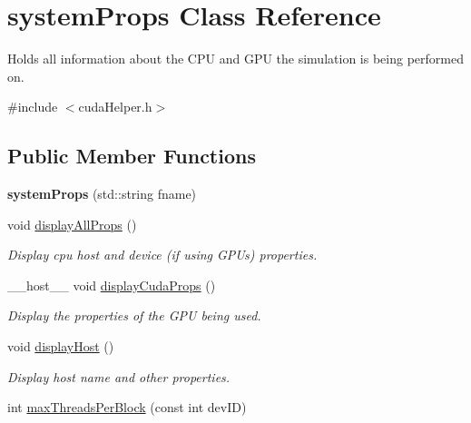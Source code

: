 \hypertarget{classsystem_props}{\section{system\-Props Class Reference}
\label{classsystem_props}
}


Holds all information about the C\-P\-U and G\-P\-U the simulation is being performed on.  




{\ttfamily \#include $<$cuda\-Helper.\-h$>$}

\subsection*{Public Member Functions}
\begin{DoxyCompactItemize}
\item 
\hypertarget{classsystem_props_a95e6d858d3ee3a0c9670156cf07c9e74}{{\bfseries system\-Props} (std\-::string fname)}\label{classsystem_props_a95e6d858d3ee3a0c9670156cf07c9e74}

\item 
\hypertarget{classsystem_props_a5268e0f1a250cdf0810e9d899b85bea2}{void \hyperlink{classsystem_props_a5268e0f1a250cdf0810e9d899b85bea2}{display\-All\-Props} ()}\label{classsystem_props_a5268e0f1a250cdf0810e9d899b85bea2}

\begin{DoxyCompactList}\small\item\em Display cpu host and device (if using G\-P\-Us) properties. \end{DoxyCompactList}\item 
\-\_\-\-\_\-host\-\_\-\-\_\- void \hyperlink{classsystem_props_aec22f83e71043fd60cb61a45fcc25b02}{display\-Cuda\-Props} ()
\begin{DoxyCompactList}\small\item\em Display the properties of the G\-P\-U being used. \end{DoxyCompactList}\item 
\hypertarget{classsystem_props_aeec628e3f468a2b274f08a0777dea6f1}{void \hyperlink{classsystem_props_aeec628e3f468a2b274f08a0777dea6f1}{display\-Host} ()}\label{classsystem_props_aeec628e3f468a2b274f08a0777dea6f1}

\begin{DoxyCompactList}\small\item\em Display host name and other properties. \end{DoxyCompactList}\item 
\hypertarget{classsystem_props_acfde8d62af2c239f6a52c02985099185}{int \hyperlink{classsystem_props_acfde8d62af2c239f6a52c02985099185}{max\-Threads\-Per\-Block} (const int dev\-I\-D)}\label{classsystem_props_acfde8d62af2c239f6a52c02985099185}


\end{DoxyCompactItemize}
